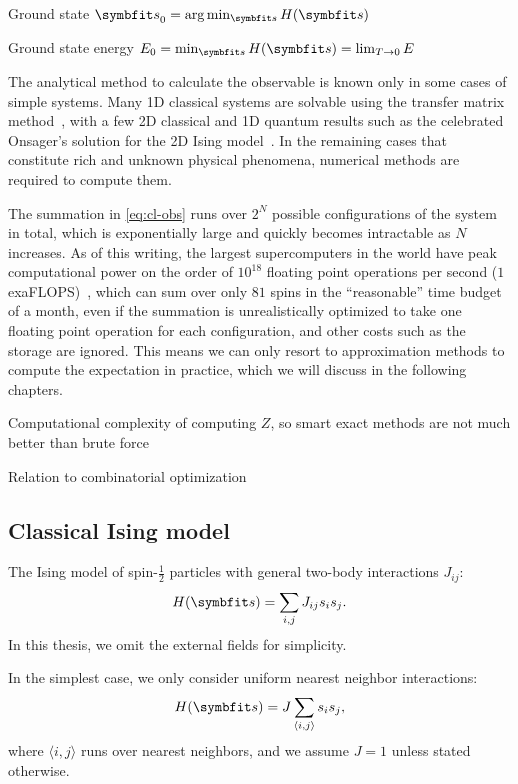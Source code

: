 Ground state $\vs_0 = \arg\min_\vs H(\vs)$

Ground state energy $E_0 = \min_\vs H(\vs) = \lim_{T \to 0} E$

The analytical method to calculate the observable is known only in some cases of simple systems. Many 1D classical systems are solvable using the transfer matrix method~\cite{chaikin1995principles5}, with a few 2D classical and 1D quantum results such as the celebrated Onsager's solution for the 2D Ising model~\cite{onsager1944crystal, baxter1995solvable,march2016exactly, caravelli2022some}. In the remaining cases that constitute rich and unknown physical phenomena, numerical methods are required to compute them.

The summation in \cref{eq:cl-obs} runs over $2^N$ possible configurations of the system in total, which is exponentially large and quickly becomes intractable as $N$ increases. As of this writing, the largest supercomputers in the world have peak computational power on the order of $10^{18}$ floating point operations per second ($1$ exaFLOPS)~\cite{kogge2022frontier}, which can sum over only $81$ spins in the ``reasonable'' time budget of a month, even if the summation is unrealistically optimized to take one floating point operation for each configuration, and other costs such as the storage are ignored. This means we can only resort to approximation methods to compute the expectation in practice, which we will discuss in the following chapters.

Computational complexity of computing $Z$, so smart exact methods are not much better than brute force

Relation to combinatorial optimization

\subsection{Classical Ising model}

The Ising model of spin-$\frac{1}{2}$ particles with general two-body interactions $J_{i j}$:
\begin{equation}
H(\vs) = \sum_{i, j} J_{i j} s_i s_j.
\label{eq:cl-ising-general}
\end{equation}
In this thesis, we omit the external fields for simplicity.

In the simplest case, we only consider uniform nearest neighbor interactions:
\begin{equation}
H(\vs) = J \sum_{\langle i, j \rangle} s_i s_j,
\label{eq:cl-ising}
\end{equation}
where $\langle i, j \rangle$ runs over nearest neighbors, and we assume $J = 1$ unless stated otherwise.

